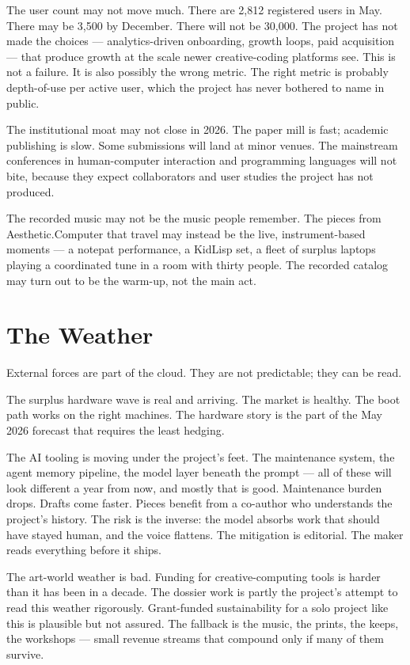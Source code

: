 \documentclass[11pt,letterpaper]{article}
\newcommand{\ac}{Aesthetic\textcolor{acpink}{.}Computer}
\newcommand{\np}{notepat}
\begin{document}
The user count may not move much. There are 2,812 registered users in May. There may be 3,500 by December. There will not be 30,000. The project has not made the choices --- analytics-driven onboarding, growth loops, paid acquisition --- that produce growth at the scale newer creative-coding platforms see. This is not a failure. It is also possibly the wrong metric. The right metric is probably depth-of-use per active user, which the project has never bothered to name in public.

The institutional moat may not close in 2026. The paper mill is fast; academic publishing is slow. Some submissions will land at minor venues. The mainstream conferences in human-computer interaction and programming languages will not bite, because they expect collaborators and user studies the project has not produced.

The recorded music may not be the music people remember. The pieces from \ac{} that travel may instead be the live, instrument-based moments --- a \np{} performance, a KidLisp set, a fleet of surplus laptops playing a coordinated tune in a room with thirty people. The recorded catalog may turn out to be the warm-up, not the main act.

\section{The Weather}

External forces are part of the cloud. They are not predictable; they can be read.

The surplus hardware wave is real and arriving. The market is healthy. The boot path works on the right machines. The hardware story is the part of the May 2026 forecast that requires the least hedging.

The AI tooling is moving under the project's feet. The maintenance system, the agent memory pipeline, the model layer beneath the prompt --- all of these will look different a year from now, and mostly that is good. Maintenance burden drops. Drafts come faster. Pieces benefit from a co-author who understands the project's history. The risk is the inverse: the model absorbs work that should have stayed human, and the voice flattens. The mitigation is editorial. The maker reads everything before it ships.

The art-world weather is bad. Funding for creative-computing tools is harder than it has been in a decade. The dossier work is partly the project's attempt to read this weather rigorously. Grant-funded sustainability for a solo project like this is plausible but not assured. The fallback is the music, the prints, the keeps, the workshops --- small revenue streams that compound only if many of them survive.
\end{document}
